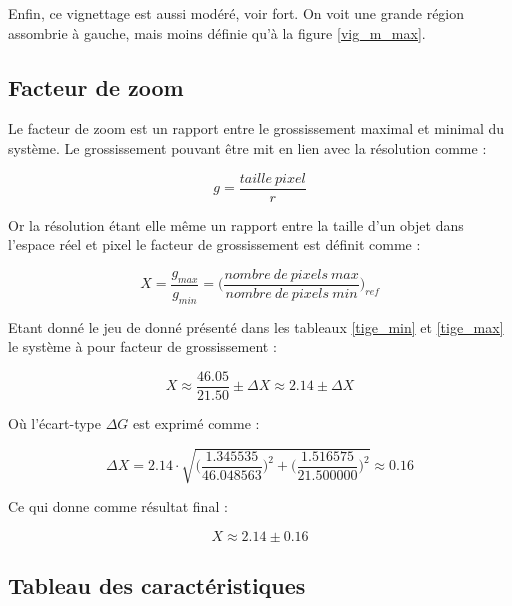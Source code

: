 \documentclass[11pt,letterpaper]{article}
\begin{document}
Enfin, ce vignettage est aussi modéré, voir fort. On voit une grande région 
assombrie à gauche, mais moins définie qu'à la figure \ref{vig_m_max}.

\subsection{Facteur de zoom}
Le facteur de zoom est un rapport entre le grossissement maximal et minimal du système. Le grossissement pouvant être mit en lien avec la résolution comme : 

\begin{equation*}
    g = \frac{taille \: pixel}{r}
\end{equation*}

Or la résolution étant elle même un rapport entre la taille d'un objet dans l'espace réel et pixel le facteur de grossissement est définit comme : 

\begin{equation*}
    X = \frac{g_{max}}{g_{min}} = \biggl(\frac{nombre \: de \: pixels \: max}{nombre \: de \: pixels \: min}\biggr)_{ref}
\end{equation*}

Etant donné le jeu de donné présenté dans les tableaux \ref{tige_min} et \ref{tige_max} le système à pour facteur de grossissement : 

\begin{equation*}
    X \approx \frac{46.05}{21.50} \pm \Delta X \approx 2.14 \pm \Delta X
\end{equation*}

Où l'écart-type $\Delta G$ est exprimé comme : 

\begin{equation*}
    \Delta X = 2.14 \cdot \sqrt{\biggl(\frac{1.345535}{46.048563}\biggr)^2 + \biggl(\frac{1.516575}{21.500000}\biggr)^2} \approx 0.16
\end{equation*}

Ce qui donne comme résultat final : 

\begin{equation*}
    X \approx 2.14 \pm 0.16
\end{equation*}

\subsection{Tableau des caractéristiques}
\end{document}
